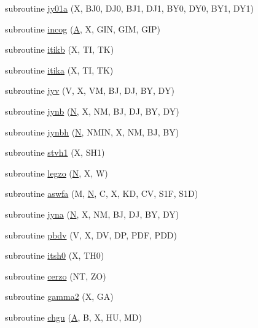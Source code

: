 \begin{DoxyCompactItemize}
\item 
subroutine \hyperlink{specfun_8f_a1e06b4f8d4718e1cbc0fc301190fadc5}{jy01a} (X, B\+J0, D\+J0, B\+J1, D\+J1, B\+Y0, D\+Y0, B\+Y1, D\+Y1)
\item 
subroutine \hyperlink{specfun_8f_a875afc25096aa6eddeb2c484ff121345}{incog} (\hyperlink{classA}{A}, X, G\+I\+N, G\+I\+M, G\+I\+P)
\item 
subroutine \hyperlink{specfun_8f_ae0d46fe20d8c2a84c08d3e35433709b3}{itikb} (X, T\+I, T\+K)
\item 
subroutine \hyperlink{specfun_8f_a24d3374893d7e943612be5ce9fcbda56}{itika} (X, T\+I, T\+K)
\item 
subroutine \hyperlink{specfun_8f_adbf3387dff9cac636a08ac2cf378a66f}{jyv} (V, X, V\+M, B\+J, D\+J, B\+Y, D\+Y)
\item 
subroutine \hyperlink{specfun_8f_a4f8e4a0f14198f3ab8c049ddfc120748}{jynb} (\hyperlink{polmisc_8c_a0240ac851181b84ac374872dc5434ee4}{N}, X, N\+M, B\+J, D\+J, B\+Y, D\+Y)
\item 
subroutine \hyperlink{specfun_8f_a6c8fe81674eb8abca7b345e7188263b5}{jynbh} (\hyperlink{polmisc_8c_a0240ac851181b84ac374872dc5434ee4}{N}, N\+M\+I\+N, X, N\+M, B\+J, B\+Y)
\item 
subroutine \hyperlink{specfun_8f_a4f6d47fcfddeeab00b3ca591e0e15544}{stvh1} (X, S\+H1)
\item 
subroutine \hyperlink{specfun_8f_a645f9408e8ff16a7fd30a32011b3733c}{legzo} (\hyperlink{polmisc_8c_a0240ac851181b84ac374872dc5434ee4}{N}, X, W)
\item 
subroutine \hyperlink{specfun_8f_a9f96c3ced448128f3dd4e7ee4a3fb53c}{aswfa} (M, \hyperlink{polmisc_8c_a0240ac851181b84ac374872dc5434ee4}{N}, C, X, K\+D, C\+V, S1\+F, S1\+D)
\item 
subroutine \hyperlink{specfun_8f_af1cade8d7f9f9611b05caf07cc62ef2c}{jyna} (\hyperlink{polmisc_8c_a0240ac851181b84ac374872dc5434ee4}{N}, X, N\+M, B\+J, D\+J, B\+Y, D\+Y)
\item 
subroutine \hyperlink{specfun_8f_ab97706c74a207c2b07fdfd7a2f5df659}{pbdv} (V, X, D\+V, D\+P, P\+D\+F, P\+D\+D)
\item 
subroutine \hyperlink{specfun_8f_a1c6575af43f14e2ccd440967f1bd2b71}{itsh0} (X, T\+H0)
\item 
subroutine \hyperlink{specfun_8f_a06a56740c88eafe0ad47fd03247ba7a6}{cerzo} (N\+T, Z\+O)
\item 
subroutine \hyperlink{specfun_8f_a1ae2d22cac21ab550defbcf865fd88f1}{gamma2} (X, G\+A)
\item 
subroutine \hyperlink{specfun_8f_a67e2e99596ac787901efcbae5d63aa42}{chgu} (\hyperlink{classA}{A}, B, X, H\+U, M\+D)

\end{DoxyCompactItemize}

